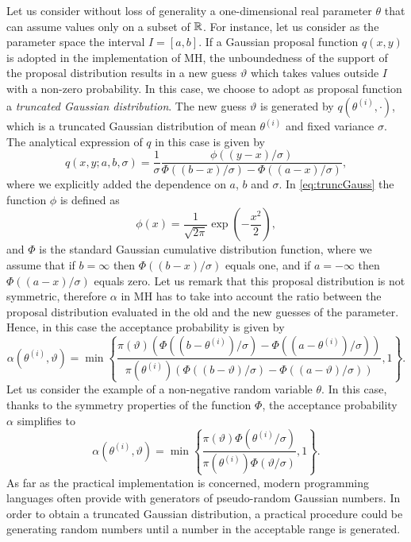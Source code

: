 Let us consider without loss of generality a one-dimensional real parameter $\theta$ that can assume values only on a subset of $\mathbb{R}$. For instance, let us consider as the parameter space the interval $I = [a, b]$. If a Gaussian proposal function $q(x, y)$ is adopted in the implementation of MH, the unboundedness of the support of the proposal distribution results in a new guess $\vartheta$ which takes values outside $I$ with a non-zero probability. In this case, we choose to adopt as proposal function a \textit{truncated Gaussian distribution}. The new guess $\vartheta$ is generated by $q(\theta^{(i)}, \cdot)$, which is a truncated Gaussian distribution of mean $\theta^{(i)}$ and fixed variance $\sigma$. The analytical expression of $q$ in this case is given by
\begin{equation}\label{eq:truncGauss}
	q(x, y; a, b, \sigma) = \frac{1}{\sigma} \frac{\phi\left((y - x)/\sigma\right)}
	{\Phi\left((b - x)/\sigma\right) - \Phi\left((a - x)/\sigma\right)},
\end{equation}
where we explicitly added the dependence on $a$, $b$ and $\sigma$. In \eqref{eq:truncGauss} the function $\phi$ is defined as
\begin{equation}
	\phi(x) = \frac{1}{\sqrt{2\pi}} \exp(-\frac{x^2}{2}),
\end{equation}
and $\Phi$ is the standard Gaussian cumulative distribution function, where we assume that if $b = \infty$ then $\Phi((b-x)/\sigma)$ equals one, and if $a = -\infty$ then $\Phi((a-x)/\sigma)$ equals zero. Let us remark that this proposal distribution is not symmetric, therefore $\alpha$ in MH has to take into account the ratio between the proposal distribution evaluated in the old and the new guesses of the parameter. Hence, in this case the acceptance probability is given by
\begin{equation}
		\alpha(\theta^{(i)}, \vartheta) = \min\left\{
		\frac{\pi(\vartheta)\left(\Phi\left((b - \theta^{(i)})/\sigma\right) - \Phi\left((a - \theta^{(i)})/\sigma\right)\right)}
		{\pi(\theta^{(i)})\left(\Phi\left((b - \vartheta)/\sigma\right) - \Phi\left((a - \vartheta)/\sigma\right)\right)}
		, 1\right\}.
\end{equation}
Let us consider the example of a non-negative random variable $\theta$. In this case, thanks to the symmetry properties of the function $\Phi$, the acceptance probability $\alpha$ simplifies to
\begin{equation}
	\alpha(\theta^{(i)}, \vartheta) = \min\left\{
	\frac{\pi(\vartheta)\Phi\left(\theta^{(i)}/\sigma\right)}
	{\pi(\theta^{(i)})\Phi\left(\vartheta/\sigma\right)}
	, 1\right\}.
\end{equation}
As far as the practical implementation is concerned, modern programming languages often provide with generators of pseudo-random Gaussian numbers. In order to obtain a truncated Gaussian distribution, a practical procedure could be generating random numbers until a number in the acceptable range is generated.

